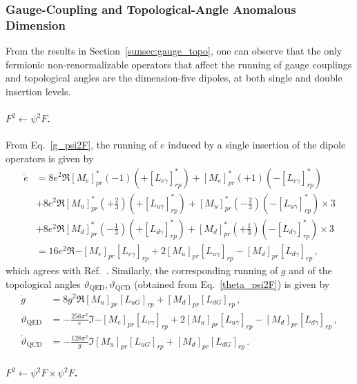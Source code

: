 \subsubsection{Gauge-Coupling and Topological-Angle Anomalous Dimension}

From the results in Section~\ref{sunsec:gauge_topo}, one can observe that the only fermionic non-renormalizable operators that affect the running of gauge couplings and topological angles are the dimension-five dipoles, at both single and double insertion levels.

\paragraph{$F^2\leftarrow \psi^2 F$.}

From Eq.~\eqref{g_psi2F}, the running of $e$ induced by a single insertion of the dipole operators is given by
\begin{align}
    \dot e &= 
    8 e^2 \Re{[M_e]^*_{pr}(-1)(+[L_{e\gamma}]^*_{rp}) + [M_e]^*_{pr}(+1)(-[L_{e\gamma}]^*_{rp})}\nonumber \\
    &+ 8 e^2 \Re{[M_u]^*_{pr}(+\tfrac{2}{3})(+[L_{u\gamma}]^*_{rp}) + [M_u]^*_{pr}(-\tfrac{2}{3})(-[L_{u\gamma}]^*_{rp})} \times 3\nonumber \\
    &+ 8 e^2 \Re{[M_d]^*_{pr}(-\tfrac{1}{3})(+[L_{d\gamma}]^*_{rp}) + [M_d]^*_{pr}(+\tfrac{1}{3})(-[L_{d\gamma}]^*_{rp})}\times 3\nonumber \\
    &= 16e^2 \Re{-[M_e]_{pr}[L_{e\gamma}]_{rp} + 2 [M_u]_{pr}[L_{u\gamma}]_{rp} - [M_d]_{pr}[L_{d\gamma}]_{rp}}\,,
\end{align}
which agrees with Ref.~\cite{Jenkins:2017dyc}. Similarly, the corresponding running of $g$ and of the topological angles $\vartheta_{\mathrm{QED}},\vartheta_{\mathrm{QCD}}$ (obtained from Eq.~\eqref{theta_psi2F}) is given by
\begin{align}
    \dot g &= 8 g^2 \Re{[M_u]_{pr}[L_{uG}]_{rp} + [M_d]_{pr}[L_{dG}]_{rp}}\,,
    \\
    \dot \vartheta_{\mathrm{QED}} &= -\frac{256\pi^2}{e}\Im{-[M_e]_{pr}[L_{e\gamma}]_{rp} + 2 [M_u]_{pr}[L_{u\gamma}]_{rp} - [M_d]_{pr}[L_{d\gamma}]_{rp}}\,,
    \\
    \dot \vartheta_{\mathrm{QCD}} &=-\frac{128\pi^2}{g}\Im{[M_u]_{pr}[L_{uG}]_{rp} + [M_d]_{pr}[L_{dG}]_{rp}}\,.
\end{align}

\paragraph{$F^2\leftarrow \psi^2 F \times \psi^2 F$.}

